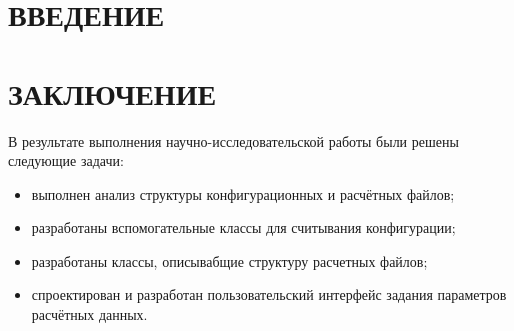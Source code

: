 \documentclass[a4paper,12pt]{article}
\begin{document}
\tableofcontents

\pagebreak

\setcounter{page}{3}

\section*{\centering ВВЕДЕНИЕ}
\pagebreak

%
\pagebreak
\pagebreak
\pagebreak
\pagebreak



\section*{\centering ЗАКЛЮЧЕНИЕ}

В результате выполнения научно-исследовательской  работы были решены следующие задачи:

\begin{itemize}
\item выполнен анализ структуры конфигурационных и расчётных файлов;
\item разработаны вспомогательные классы для считывания конфигурации;
\item разработаны классы, описывабщие структуру расчетных файлов;
\item спроектирован и разработан пользовательский интерфейс задания параметров расчётных данных.

\end{itemize}


\pagebreak
\printbibliography
\end{document}
